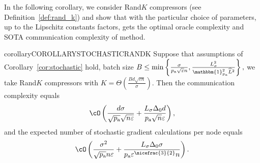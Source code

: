 \documentclass{article}
\newcommand{\algorithmname}{DASHA-PP}
\newcommand*{\probavailable}{\ensuremath{p_{\textnormal{a}}}}
\begin{document}

In the following corollary, we consider Rand$K$ compressors (see Definition~\ref{def:rand_k}) and show that with the particular choice of parameters, up to the Lipschitz constants factors, \algname{\algorithmname-MVR} gets the optimal oracle complexity and SOTA communication complexity of  method.

\begin{restatable}{corollary}{COROLLARYSTOCHASTICRANDK}
  \label{cor:stochastic:randk}
  Suppose that assumptions of Corollary~\ref{cor:stochastic} hold, batch size $B \leq \min\left\{\frac{\sigma}{\probavailable\sqrt{\varepsilon} n}, \frac{L_{\sigma}^2}{\mathbbm{1}_{\probavailable}^2 \widehat{L}^2}\right\},$ we take Rand$K$ compressors with $K = \Theta\left(\frac{B d \sqrt{\varepsilon n}}{\sigma}\right).$ Then
  the communication complexity equals 
  \begin{align}
      \label{eq:complexity:stochastic:communication}
      \cO\left(\frac{d \sigma}{\sqrt{\probavailable} \sqrt{n \varepsilon}} + \frac{L_{\sigma} \Delta_0 d}{\probavailable \sqrt{n} \varepsilon}\right),
  \end{align}
  and the expected number of stochastic gradient calculations per node equals
  \begin{align}
      \label{eq:complexity:stochastic_oracle}
      \cO\left(\frac{\sigma^2}{\sqrt{\probavailable} n \varepsilon} + \frac{L_{\sigma} \Delta_0 \sigma}{\probavailable \varepsilon^{\nicefrac{3}{2}} n}\right).
  \end{align}
\end{restatable}
\end{document}
